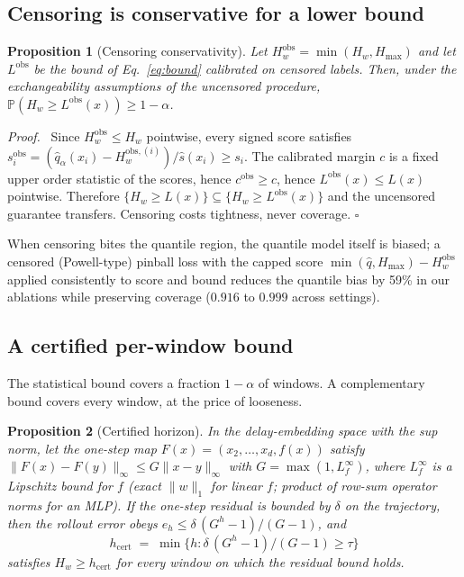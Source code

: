 \documentclass[aps,pre,twocolumn,superscriptaddress,nofootinbib,longbibliography]{revtex4-2}
\newtheorem{proposition}{Proposition}
\newenvironment{myproof}{\par\noindent\textit{Proof.}\ }{\hfill$\square$\par\medskip}
\newcommand{\Hw}{H_w}
\newcommand{\Hmax}{H_{\max}}
\begin{document}
\subsection{Censoring is conservative for a lower bound}

\begin{proposition}[Censoring conservativity]
\label{prop:censoring}
Let $\Hw^{\mathrm{obs}} = \min(\Hw, \Hmax)$ and let $L^{\mathrm{obs}}$ be
the bound of Eq.~\eqref{eq:bound} calibrated on censored labels. Then,
under the exchangeability assumptions of the uncensored procedure,
$\mathbb{P}(\Hw \ge L^{\mathrm{obs}}(x)) \ge 1-\alpha$.
\end{proposition}

\begin{myproof}
Since $\Hw^{\mathrm{obs}} \le \Hw$ pointwise, every signed score satisfies
$s_i^{\mathrm{obs}} = (\hat q_\alpha(x_i) - \Hw^{\mathrm{obs},(i)})/\hat
s(x_i) \ge s_i$. The calibrated margin $c$ is a fixed upper order
statistic of the scores, hence $c^{\mathrm{obs}} \ge c$, hence
$L^{\mathrm{obs}}(x) \le L(x)$ pointwise. Therefore $\{\Hw \ge L(x)\}
\subseteq \{\Hw \ge L^{\mathrm{obs}}(x)\}$ and the uncensored guarantee
transfers. Censoring costs tightness, never coverage.
\end{myproof}

When censoring bites the quantile region, the quantile model itself is
biased; a censored (Powell-type) pinball loss \citep{powell1986censored}
with the capped score $\min(\hat q, \Hmax) - \Hw^{\mathrm{obs}}$ applied
consistently to score and bound reduces the quantile bias by 59\% in our
ablations while preserving coverage ($0.916$ to $0.999$ across settings).

\subsection{A certified per-window bound}

The statistical bound covers a fraction $1-\alpha$ of windows. A
complementary bound covers every window, at the price of looseness.

\begin{proposition}[Certified horizon]
\label{prop:certified}
In the delay-embedding space with the sup norm, let the one-step map
$F(x) = (x_2, \dots, x_d, f(x))$ satisfy $\|F(x) - F(y)\|_\infty \le
G\|x-y\|_\infty$ with $G = \max(1, L_f^\infty)$, where $L_f^\infty$ is a
Lipschitz bound for $f$ (exact $\|w\|_1$ for linear $f$; product of
row-sum operator norms for an MLP). If the one-step residual is bounded
by $\delta$ on the trajectory, then the rollout error obeys
$e_h \le \delta\,(G^h - 1)/(G - 1)$, and
\begin{equation}
h_{\mathrm{cert}} \;=\; \min\{h : \delta\,(G^h - 1)/(G-1) \ge \tau\}
\end{equation}
satisfies $\Hw \ge h_{\mathrm{cert}}$ for every window on which the
residual bound holds.
\end{proposition}
\end{document}

